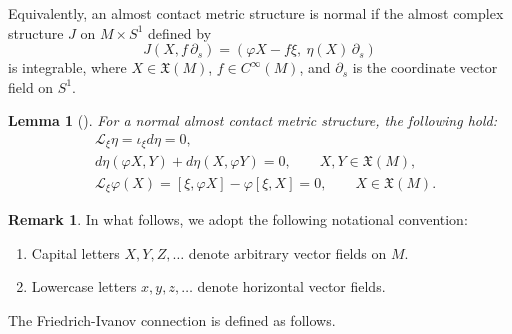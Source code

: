 \documentclass{article}
\newtheorem{lem}[thm]{Lemma}
\theoremstyle{definition}
\newtheorem{rmk}[thm]{Remark}
\renewcommand{\phi}{\varphi}
\numberwithin{equation}{section}
\begin{document}
Equivalently, an almost contact metric structure is normal if the almost complex structure \(J\) on \(M \times S^1\) defined by
\begin{equation} \label{eqn:cpxstructure}
    J(X, f\,\partial_s) = (\phi X - f \xi,\ \eta(X)\,\partial_s)
\end{equation}
is integrable, where \(X \in \mathfrak{X}(M)\), \(f \in C^\infty(M)\), and \(\partial_s\) is the coordinate vector field on \(S^1\).

\begin{lem}[\cite{Bl,BG}] \label{lem:blair}
For a normal almost contact metric structure, the following hold:
\begin{align}
&\mathcal{L}_\xi \eta = \iota_\xi d\eta = 0, \label{eqn:xieta}\\
&d\eta(\phi X, Y) + d\eta(X, \phi Y) = 0, \qquad X,Y \in \mathfrak{X}(M), \label{eqn:dn11} \\
&\mathcal{L}_\xi \phi (X) = [\xi, \phi X] - \phi[\xi,X] = 0, \qquad X \in \mathfrak{X}(M). \label{eqn:xiphi}
\end{align}
\end{lem}
 
\medskip

\begin{rmk}
In what follows, we adopt the following notational convention:
\begin{enumerate}
    \item Capital letters \(X, Y, Z, \dots\) denote arbitrary vector fields on \(M\).
    \item Lowercase letters \(x, y, z, \dots\) denote horizontal vector fields.
\end{enumerate}
\end{rmk}

The Friedrich-Ivanov connection is defined as follows.
\end{document}
